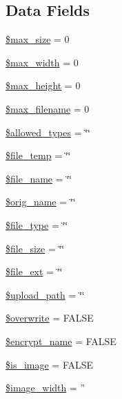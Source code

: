 \subsection*{Data Fields}
\begin{DoxyCompactItemize}
\item 
\hyperlink{class_c_i___upload_a3fec414be9f76cb7ba77ed79b784de62}{\$max\-\_\-size} = 0
\item 
\hyperlink{class_c_i___upload_a7f6a5db40a5fd00c8babbd37480b00fc}{\$max\-\_\-width} = 0
\item 
\hyperlink{class_c_i___upload_a7f2b56fde8cdd8907f9228149fc4b9bc}{\$max\-\_\-height} = 0
\item 
\hyperlink{class_c_i___upload_a7c8c80e453111c2521e355b83331a9df}{\$max\-\_\-filename} = 0
\item 
\hyperlink{class_c_i___upload_a2e0df9e15179e2db66d161206842d6c0}{\$allowed\-\_\-types} = \char`\"{}\char`\"{}
\item 
\hyperlink{class_c_i___upload_a8b49917820e40f0b8956d95c1fd6ee6e}{\$file\-\_\-temp} = \char`\"{}\char`\"{}
\item 
\hyperlink{class_c_i___upload_a59bf132c77b5bee5adff2098cc2a6fbc}{\$file\-\_\-name} = \char`\"{}\char`\"{}
\item 
\hyperlink{class_c_i___upload_a2704f7723b97b03285de219442ae3e2b}{\$orig\-\_\-name} = \char`\"{}\char`\"{}
\item 
\hyperlink{class_c_i___upload_a6210dfa92a7e2e5e9db1aa2337ce4cd1}{\$file\-\_\-type} = \char`\"{}\char`\"{}
\item 
\hyperlink{class_c_i___upload_a5b3595a69dbf686d879bd009ec9c0317}{\$file\-\_\-size} = \char`\"{}\char`\"{}
\item 
\hyperlink{class_c_i___upload_a65b080519869bc14d792c1800e3362f5}{\$file\-\_\-ext} = \char`\"{}\char`\"{}
\item 
\hyperlink{class_c_i___upload_a38507bf82f955d4b13642a3c7fd6e773}{\$upload\-\_\-path} = \char`\"{}\char`\"{}
\item 
\hyperlink{class_c_i___upload_a8d31b0ad9cccde7e2d857097672ed6cf}{\$overwrite} = F\-A\-L\-S\-E
\item 
\hyperlink{class_c_i___upload_a54a751add0762edd4da11373e3b56687}{\$encrypt\-\_\-name} = F\-A\-L\-S\-E
\item 
\hyperlink{class_c_i___upload_a4dae8ae20ed5fdf406554e1911065753}{\$is\-\_\-image} = F\-A\-L\-S\-E
\item 
\hyperlink{class_c_i___upload_a8dadc2d2dcc0f25529a2d1e080d08169}{\$image\-\_\-width} = ''
\item 

\end{DoxyCompactItemize}
